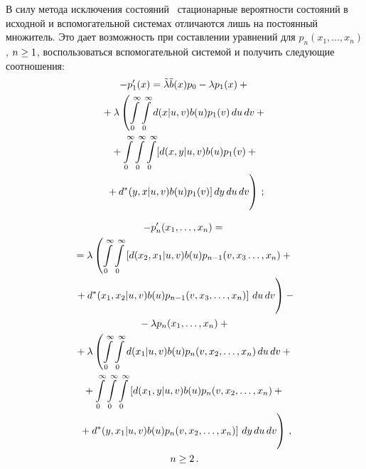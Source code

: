 \begin{multicols}{2}
В силу метода исключения состояний~\cite{ppav}
стационарные вероятности состояний в исходной
и вспомогательной системах отличаются лишь на
постоянный множитель.
Это дает возможность при составлении
уравнений для $p_n(x_1,\ldots,x_{n})$, $n\hm\ge 1$,
воспользоваться вспомогательной системой и
получить следующие соотношения:
\begin{multline}
\label{(3.1)}
-p'_1(x) =
\tilde\lambda \tilde b(x) p_0 - \lambda p_1(x) +{}\\
{}+ \lambda \left(
\int\limits_0^\infty \int\limits_0^\infty
d(x|u,v) b(u) p_1(v) \,du\,dv
+ {}\right.\\
{}+
\int\limits_0^\infty \int\limits_0^\infty \int\limits_0^\infty
[d(x,y|u,v) b(u) p_1(v) +{}\\
\left.{}+ d^*(y,x|u,v) b(u) p_1(v)]
\,dy\,du\,dv \vphantom{\int\limits_0^\infty}
\right)\,;
\end{multline}

\vspace*{-12pt}

\noindent
\begin{multline}
\label{(3.2)}
-p'_{n}(x_1,\ldots,x_n) = {}\\
{}= \lambda \left(
\int\limits_0^\infty \int\limits_0^\infty
\left[d(x_2,x_1|u,v) b(u) p_{n-1}(v,x_3\ldots,x_n)
+ {}\right.\right.\\
\left.\left.{}+
d^*(x_1,x_2|u,v) b(u) p_{n-1}(v,x_3,\ldots,x_n)\right] \,du\,dv
\vphantom{\int\limits_0^\infty}
\right)
- {}\\
{}- \lambda p_{n}(x_1,\ldots,x_n) +{}\\
{}+ \lambda
\left(
\int\limits_0^\infty
\int\limits_0^\infty
d(x_1|u,v) b(u) p_{n}(v,x_2,\ldots,x_n)
\,du\,dv
+ {}\right.\\
{}+ \int\limits_0^\infty
\int\limits_0^\infty
\int\limits_0^\infty
\left[d(x_1,y|u,v) b(u) p_{n}(v,x_2,\ldots,x_n)
+ {}\right.\\
\left.\left.{}+
d^*(y,x_1|u,v) b(u) p_{n}(v,x_2,\ldots,x_n)\right]
\,dy\,du\,dv \vphantom{\int\limits_0^\infty}\right)\,,
\\ n\ge 2\,.
\end{multline}


\end{multicols}

